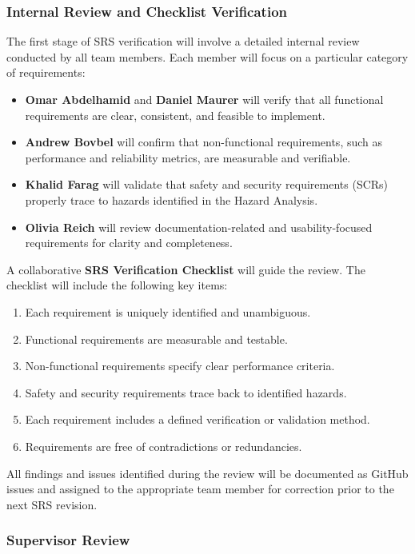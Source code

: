 \documentclass[12pt, titlepage]{article}
\begin{document}
\subsubsection{Internal Review and Checklist Verification}

The first stage of SRS verification will involve a detailed internal review conducted by all team members. Each member will focus on a particular category of requirements:

\begin{itemize}
  \item \textbf{Omar Abdelhamid} and \textbf{Daniel Maurer} will verify that all functional requirements are clear, consistent, and feasible to implement.
  \item \textbf{Andrew Bovbel} will confirm that non-functional requirements, such as performance and reliability metrics, are measurable and verifiable.
  \item \textbf{Khalid Farag} will validate that safety and security requirements (SCRs) properly trace to hazards identified in the Hazard Analysis.
  \item \textbf{Olivia Reich} will review documentation-related and usability-focused requirements for clarity and completeness.
\end{itemize}

A collaborative \textbf{SRS Verification Checklist} will guide the review. The checklist will include the following key items:

\begin{enumerate}
  \item Each requirement is uniquely identified and unambiguous.
  \item Functional requirements are measurable and testable.
  \item Non-functional requirements specify clear performance criteria.
  \item Safety and security requirements trace back to identified hazards.
  \item Each requirement includes a defined verification or validation method.
  \item Requirements are free of contradictions or redundancies.
\end{enumerate}

All findings and issues identified during the review will be documented as GitHub issues and assigned to the appropriate team member for correction prior to the next SRS revision.

\subsubsection{Supervisor Review}
\end{document}
